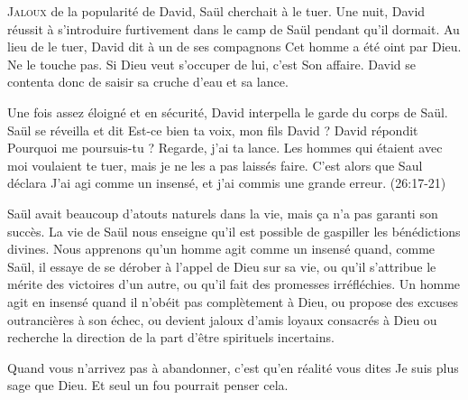 
\lettrine{J}{aloux} de la popularité de David, Saül cherchait à le tuer.
 Une nuit, David réussit à s'introduire furtivement dans le camp de Saül
 pendant qu'il dormait. Au lieu de le tuer, David dit à un de ses compagnons\frcolon{}
 \Og Cet homme a été oint par Dieu. Ne le touche pas.
 Si Dieu veut s'occuper de lui, c'est Son affaire. \Fg{}
 David se contenta donc de saisir sa cruche d'eau et sa lance.

Une fois assez éloigné et en sécurité, David interpella
 le garde du corps de Saül.
 Saül se réveilla et dit\frcolon{}
 \Og Est-ce bien ta voix, mon fils David ? \Fg{}
 David répondit\frcolon{}
 \Og Pourquoi me poursuis-tu ? Regarde, j'ai ta lance.
 Les hommes qui étaient avec moi voulaient te tuer,
 mais je ne les a pas laissés faire. \Fg{}
 C'est alors que Saul déclara\frcolon{}
 \Og J'ai agi comme un insensé, et j'ai commis une grande erreur. \Fg{}
 (26:17-21)

Saül avait beaucoup d'atouts naturels dans la vie,
 mais \c{c}a n'a pas garanti son succès.
 La vie de Saül nous enseigne qu'il est possible
 de gaspiller les bénédictions divines.
 Nous apprenons qu'un homme agit comme un insensé quand,
 comme Saül, il essaye de se dérober à l'appel de Dieu sur sa vie,
 ou qu'il s'attribue le mérite des victoires d'un autre,
 ou qu'il fait des promesses irréfléchies.
 Un homme agit en insensé quand il n'obéit pas complètement à Dieu,
 ou propose des excuses outrancières à son échec,
 ou devient jaloux d'amis loyaux consacrés à Dieu
 ou recherche la direction de la part d'être spirituels incertains.


Quand vous n'arrivez pas à abandonner, c'est qu'en réalité vous dites\frcolon{}
 \Og Je suis plus sage que Dieu. \Fg{}
 Et seul un fou pourrait penser cela. 

\dvrule






